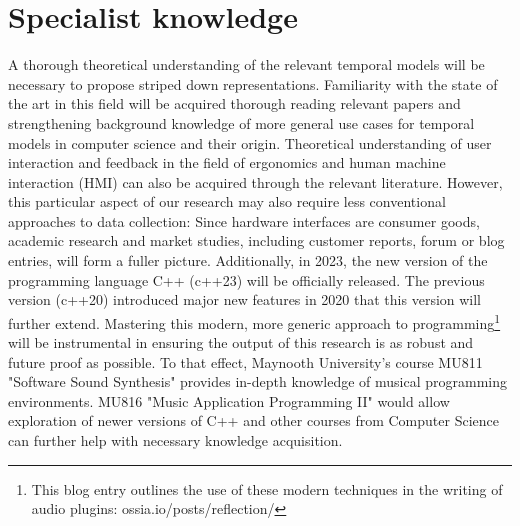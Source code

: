\documentclass[journal,onecolumn]{IEEEtran}
\begin{document}
\section{Specialist knowledge} %
A thorough theoretical understanding of the relevant temporal models will be necessary to propose striped down representations. Familiarity with the state of the art in this field will be acquired thorough reading relevant papers and strengthening background knowledge of more general use cases for temporal models in computer science and their origin. Theoretical understanding of user interaction and feedback in the field of ergonomics and human machine interaction (HMI) can also be acquired through the relevant literature. However, this particular aspect of our research may also require less conventional approaches to data collection: Since hardware interfaces are consumer goods,  academic research and market studies, including customer reports, forum or blog entries, will form a fuller picture.
Additionally, in 2023, the new version of the programming language C++ (c++23) will be officially released. The previous version (c++20) introduced major new features in 2020 that this version will further extend. Mastering this modern, more generic approach to programming\footnote{This blog entry outlines  the use of these modern techniques in the writing of audio plugins: ossia.io/posts/reflection/} will be instrumental in ensuring the output of this research is as robust and future proof as possible. To that effect, Maynooth University's course MU811 "Software Sound Synthesis" provides in-depth knowledge of musical programming environments. MU816 "Music Application Programming II" would allow exploration of newer versions of C++ and other courses from Computer Science can further help with necessary knowledge acquisition.
\end{document}
